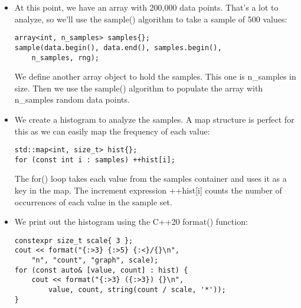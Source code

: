 \begin{itemize}
\begin{lstlisting}[style=styleCXX]
array<int, n_data> v{};
for(auto& e : v) e = iround(dist(rng));
\end{lstlisting}

The array container is fixed in size, so the template parameters include a size\_t value for the number of elements to allocate. We use a for() loop to populate the array.

The rng object is the hardware random number generator. This is passed to dist(), our normal\_distribution object, and then to iround(), our integer rounding function.

\item 
At this point, we have an array with 200,000 data points. That's a lot to analyze, so we'll use the sample() algorithm to take a sample of 500 values:

\begin{lstlisting}[style=styleCXX]
array<int, n_samples> samples{};
sample(data.begin(), data.end(), samples.begin(),
	n_samples, rng);
\end{lstlisting}

We define another array object to hold the samples. This one is n\_samples in size. Then we use the sample() algorithm to populate the array with n\_samples random data points.

\item 
We create a histogram to analyze the samples. A map structure is perfect for this as we can easily map the frequency of each value:

\begin{lstlisting}[style=styleCXX]
std::map<int, size_t> hist{};
for (const int i : samples) ++hist[i];
\end{lstlisting}

The for() loop takes each value from the samples container and uses it as a key in the map. The increment expression ++hist[i] counts the number of occurrences of each value in the sample set.

\item 
We print out the histogram using the C++20 format() function:

\begin{lstlisting}[style=styleCXX]
constexpr size_t scale{ 3 };
cout << format("{:>3} {:>5} {:<}/{}\n",
	"n", "count", "graph", scale);
for (const auto& [value, count] : hist) {
	cout << format("{:>3} ({:>3}) {}\n",
		value, count, string(count / scale, '*'));
}
\end{lstlisting}


\end{itemize}
